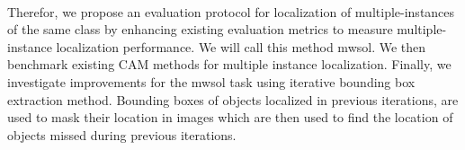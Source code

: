 \\
Therefor, we propose an evaluation protocol for localization of multiple-instances of the same class by enhancing existing evaluation metrics \cite{choe2020evaluating} to measure multiple-instance localization performance. We will call this method \acrfull{mwsol}. We then benchmark existing CAM methods for multiple instance localization. Finally, we investigate improvements for the \acrshort{mwsol} task using iterative bounding box extraction method. Bounding boxes of objects localized in previous iterations, are used to mask their location in images which are then used to find the location of objects missed during previous iterations.\\
